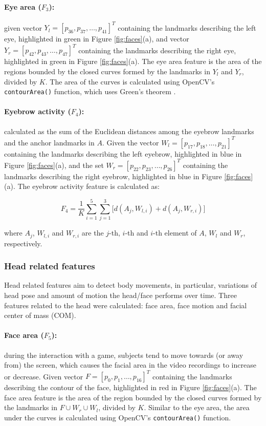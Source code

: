 \paragraph{Eye area ($F_3$):} given vector $Y_l = [p_{36}, p_{37}, \dots, p_{41}]^T$ containing the landmarks describing the left eye, highlighted in green in Figure \ref{fig:faces}(a), and vector $Y_r = [p_{42}, p_{43}, \dots, p_{47}]^T$ containing the landmarks describing the right eye, highlighted in green in Figure \ref{fig:faces}(a). The eye area feature is the area of the regions bounded by the closed curves formed by the landmarks in $Y_l$ and $Y_r$, divided by $K$. The area of the curves is calculated using OpenCV's \texttt{contourArea()} function, which uses Green's theorem \parencite{stewart2011calculus}.

\paragraph{Eyebrow activity ($F_4$):} calculated as the sum of the Euclidean distances among the eyebrow landmarks and the anchor landmarks in $A$. Given the vector $W_l = [p_{17}, p_{18}, \dots, p_{21}]^T$ containing the landmarks describing the left eyebrow, highlighted in blue in Figure \ref{fig:faces}(a), and the set $W_r = [p_{22}, p_{23}, \dots, p_{26}]^T$ containing the landmarks describing the right eyebrow, highlighted in blue in Figure \ref{fig:faces}(a). The eyebrow activity feature is calculated as:

\[
F_4 = \frac{1}{K} \sum_{i=1}^{5} \sum_{j=1}^{3} \Big[ d(A_j, W_{l,i}) + d(A_j, W_{r,i}) \Big]
\]

where $A_j$, $W_{l,i}$ and $W_{r,i}$ are the $j$-th, $i$-th and $i$-th element of $A$, $W_l$ and $W_r$, respectively.

\subsubsection{Head related features}

Head related features aim to detect body movements, in particular, variations of head pose and amount of motion the head/face performs over time. Three features related to the head were calculated: face area, face motion and facial center of mass (COM).

\paragraph{Face area ($F_5$):} during the interaction with a game, subjects tend to move towards (or away from) the screen, which causes the facial area in the video recordings to increase or decrease. Given vector $F = [p_{0}, p_{1}, \dots, p_{16}]^T$ containing the landmarks describing the contour of the face, highlighted in red in Figure \ref{fig:faces}(a). The face area feature is the area of the region bounded by the closed curves formed by the landmarks in $F \cup W_r \cup W_l$, divided by $K$. Similar to the eye area, the area under the curves is calculated using OpenCV's \texttt{contourArea()} function.

